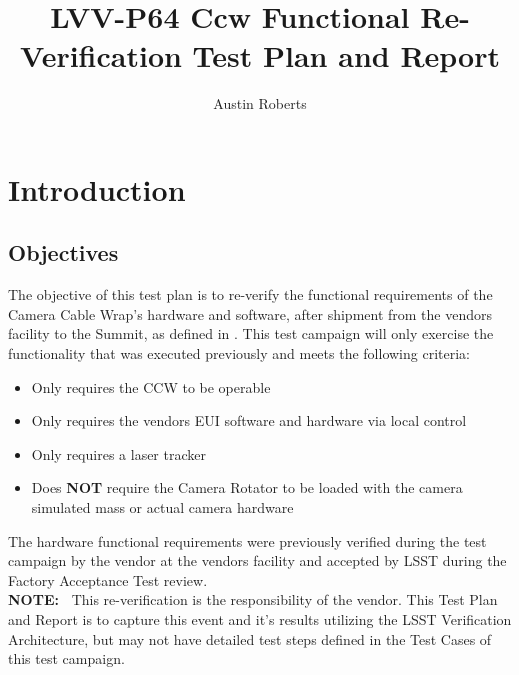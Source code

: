 \documentclass[SE,lsstdraft,STR,toc]{lsstdoc}
\providecommand{\tightlist}{
  \setlength{\itemsep}{0pt}\setlength{\parskip}{0pt}}
\begin{document}
\def\milestoneName{Ccw Functional Re-Verification}
\def\milestoneId{LVV-P64}
\def\product{SIT-COM Integration}


\title{ LVV-P64 Ccw Functional Re-Verification Test Plan and Report}
\setDocRef{\lsstDocType-\lsstDocNum}
\date{\vcsdate}
\author{ Austin Roberts }






\maketitle

\section{Introduction}
\label{sect:intro}


\subsection{Objectives}
\label{sect:objectives}

The objective of this test plan is to re-verify the functional
requirements of the Camera Cable Wrap's hardware and software, after
shipment from the vendors facility to the Summit, as defined in .
This test campaign will only exercise the functionality that was
executed previously and meets the following criteria:

\begin{itemize}
\tightlist
\item
  Only requires the CCW to be operable
\item
  Only requires the vendors EUI software and hardware via local control
\item
  Only requires a laser tracker
\item
  Does \textbf{NOT} require the Camera Rotator to be loaded with the
  camera simulated mass or actual camera hardware
\end{itemize}

The hardware functional requirements were previously verified during the
test campaign by the vendor at the vendors facility and accepted by LSST
during the Factory Acceptance Test
review.\\[2\baselineskip]\textbf{NOTE:~} This re-verification is the
responsibility of the vendor. This Test Plan and Report is to capture
this event and it's results utilizing the LSST Verification
Architecture, but may not have detailed test steps defined in the Test
Cases of this test campaign.
\end{document}
